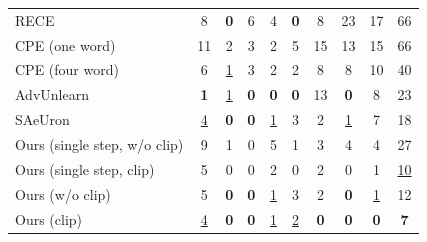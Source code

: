 \begin{table}[h]
{\begin{tabular}{lccccccccc}
RECE \cite{DBLP:conf/eccv/GongCWCJ24}  & 8    & \textbf{0}   & 6 & 4 & \textbf{0}    & 8 & 23   & 17  & 66    \\
CPE (one word) \cite{lee2024cpe}   & 11    & 2   & 3 & 2  & 5   & 15 & 13    & 15  & 66    \\
CPE (four word) \cite{lee2024cpe} & 6    & \underline{1}   & 3  & 2 & 2   & 8 & 8    & 10 & 40    \\
AdvUnlearn \cite{zhang2024defensive} & \textbf{1} & \underline{1} & \textbf{0} & \textbf{0} & \textbf{0} & 13  & \textbf{0} & 8 & 23 \\
SAeUron \cite{cywinski2025saeuron}    & \underline{4}    & \textbf{0}   & \textbf{0}  & \underline{1}  & 3    &  2 & \underline{1}    & 7  & 18    \\

Ours (single step, w/o clip)   &   9  & 1   &   0  &   5  &  1   & 3 & 4    &   4 & 27 \\
Ours (single step, clip)   &  5   &  0  & 0 &   2   &   0  & 2 &  0   &    1      & \underline{10} \\

Ours (w/o clip)   & 5    & \textbf{0}   & \textbf{0}         & \underline{1}            & 3    & 2 & \textbf{0}    & \underline{1}          & 12 \\
Ours (clip)   & \underline{4}    & \textbf{0}   & \textbf{0}         & \underline{1}            & \underline{2}    & \textbf{0} & \textbf{0}    & \textbf{0}          & \textbf{7} \\\bottomrule
\end{tabular}
}

\label{tab:sd14_0_nudity}
\end{table}